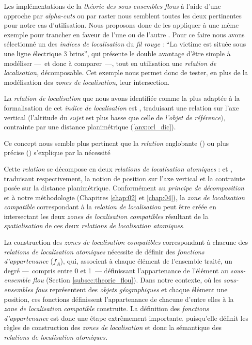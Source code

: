 Les implémentations de la \emph{théorie des sous-ensembles flous} à
l'aide d'une approche par \emph{alpha-cuts} ou par raster nous
semblent toutes les deux pertinentes pour notre cas
d'utilisation. Nous proposons donc de les appliquer à une même exemple
pour trancher en faveur de l'une ou de l'autre
\autocite{Bunel2019a}. Pour ce faire nous avons sélectionné un des
\emph{indices de localisation} du \emph{fil rouge} : \enquote{La
  victime est située sous une ligne électrique 3 brins}, qui présente
le double avantage d'être simple à modéliser ---~et donc à
comparer~---, tout en utilisation une \emph{relation de localisation,}
décomposable. Cet exemple nous permet donc de tester, en plus de la
modélisation des \emph{zones de localisation,} leur intersection.

La \emph{relation de localisation} que nous avons identifiée comme la
plus adaptée à la formalisation de cet \emph{indice de localisation}
est , traduisant une relation sur l'axe
vertical (l'altitude du \emph{sujet} est plus basse que celle de
\emph{l'objet de référence}), contrainte par une distance
planimétrique (\autoref{anx:orl_dic}).

Ce concept nous semble plus pertinent que la \emph{relation}
englobante () ou plus précise
() s'explique par la nécessité

Cette \emph{relation} se décompose en deux \emph{relations de
  localisation atomiques} :
 et
,
traduisant respectivement, la notion de position sur l'axe vertical et
la contrainte posée sur la distance planimétrique. Conformément au
\emph{principe de décomposition} et à notre méthodologie (Chapitres
\ref{chap:02} et \ref{chap:04}), la \emph{zone de localisation
  compatible} correspondant à la \emph{relation de localisation}
 peut être créée en intersectant les
deux \emph{zones de localisation compatibles} résultant de la
\emph{spatialisation} de ces deux \emph{relations de localisation
  atomiques.}

La construction des \emph{zones de localisation compatibles}
correspondant à chacune des \emph{relations de localisation atomiques}
nécessite de définir des \emph{fonctions d'appartenance} ($f_A$), qui,
associent à chaque élément de l'ensemble traité, un degré ---~compris
entre 0 et 1~--- définissant l'appartenance de l'élément au
\emph{sous-ensemble flou} (Section \ref{subsec:theorie_flou}). Dans
notre contexte, où les \emph{sous-ensembles fous} représentent des
\emph{objets géographiques} et chaque élément une position, ces
fonctions définissent l'appartenance de chacune d'entre elles à la
\emph{zone de localisation compatible} construite. La définition des
\emph{fonctions d'appartenance} est donc une étape extrêmement
importante, puisqu'elle définit les règles de construction des
\emph{zones de localisation} et donc la sémantique des \emph{relations
  de localisation atomiques.}

